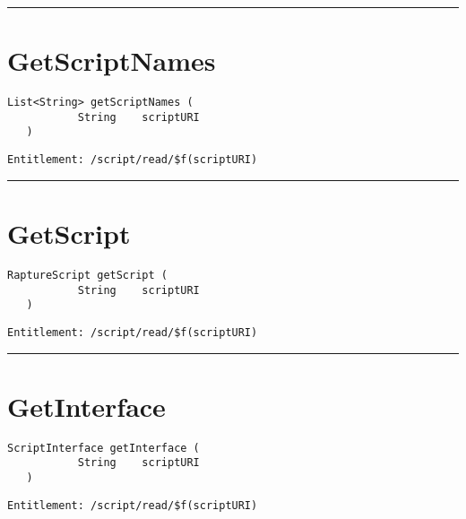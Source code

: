 \rule{12cm}{2pt}
\section{GetScriptNames}
\label{Api:GetScriptNames}
\begin{lstlisting}[style=nonumbers]
   List<String> getScriptNames (
           String    scriptURI
   )
\end{lstlisting}
\begin{Verbatim}[formatcom=\color{Maroon}]
  Entitlement: /script/read/$f(scriptURI)
\end{Verbatim}



\rule{12cm}{2pt}
\section{GetScript}
\label{Api:GetScript}
\begin{lstlisting}[style=nonumbers]
   RaptureScript getScript (
           String    scriptURI
   )
\end{lstlisting}
\begin{Verbatim}[formatcom=\color{Maroon}]
  Entitlement: /script/read/$f(scriptURI)
\end{Verbatim}



\rule{12cm}{2pt}
\section{GetInterface}
\label{Api:GetInterface}
\begin{lstlisting}[style=nonumbers]
   ScriptInterface getInterface (
           String    scriptURI
   )
\end{lstlisting}
\begin{Verbatim}[formatcom=\color{Maroon}]
  Entitlement: /script/read/$f(scriptURI)
\end{Verbatim}



